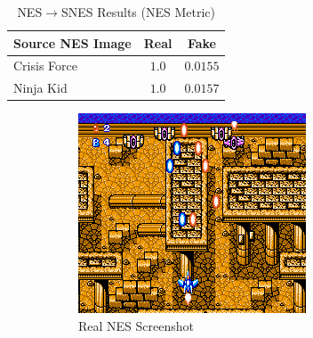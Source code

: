 \documentclass[10pt,twocolumn,letterpaper]{article}
\begin{document}
\begin{table}[H]
   \begin{center}
      \begin{tabular}{|l|c|c|}
         \hline
         Source NES Image & Real  & Fake     \\
         \hline\hline
         Crisis Force     & $1.0$ & $0.0155$ \\
         Ninja Kid        & $1.0$ & $0.0157$ \\
         \hline
      \end{tabular}
   \end{center}
   \caption{NES$\rightarrow$SNES Results (NES Metric)}
   \label{tab:snesresults}
\end{table}


\begin{figure}[H]
   \centering
   \begin{subfigure}[b]{0.235\textwidth}
      \includegraphics[width=\textwidth]{figures/nes_to_snes/Crisis_Force_(J)__ucc__12_real_A.png}
      \caption{Real NES Screenshot}
      \label{fig:ss3a}
   \end{subfigure}
   \begin{subfigure}[b]{0.235\textwidth}

\end{subfigure}
\end{figure}
\end{document}
